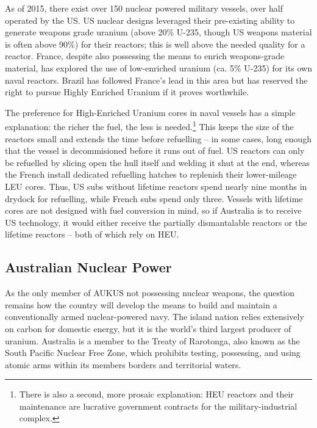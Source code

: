 \documentclass[letterpaper,12pt,twoside]{article} %
\begin{document}
\begin{multicols}{2}
As of 2015, there exist over 150 nuclear powered military vessels, over half operated by the US.\autocite[3]{hippel2016banning} US nuclear designs leveraged their pre-existing ability to generate weapons grade uranium (above 20\% U-235, though US weapons material is often above 90\%) for their reactors; this is well above the needed quality for a reactor. France, despite also possessing the means to enrich weapons-grade material, has explored the use of low-enriched uranium (ca. 5\% U-235) for its own naval reactors. Brazil has followed France's lead in this area but has reserved the right to pursue Highly Enriched Uranium if it proves worthwhile.

The preference for High-Enriched Uranium cores in naval vessels has a simple explanation: the richer the fuel, the less is needed.\footnote{There is also a second, more prosaic explanation: HEU reactors and their maintenance are lucrative government contracts for the military-industrial complex.} This keeps the size of the reactors small and extends the time before refuelling -- in some cases, long enough that the vessel is decommisioned before it runs out of fuel. US reactors can only be refuelled by slicing open the hull itself and welding it shut at the end, whereas the French install dedicated refuelling hatches to replenish their lower-mileage LEU cores. Thus, US subs without lifetime reactors spend nearly nine months in drydock for refuelling, while French subs spend only three.\autocite[24]{hippel2016banning} Vessels with lifetime cores are not designed with fuel conversion in mind, so if Australia is to receive US technology, it would either receive the partially dismantalable reactors or the lifetime reactors -- both of which rely on HEU.

\subsection{Australian Nuclear Power}

As the only member of AUKUS not possessing nuclear weapons, the question remains how the country will develop the means to build and maintain a conventionally armed nuclear-powered navy. The island nation relies extensively on carbon for domestic energy, but it is the world's third largest producer of uranium. Australia is a member to the Treaty of Rarotonga, also known as the South Pacific Nuclear Free Zone, which prohibits testing, possessing, and using atomic arms within its members borders and territorial waters.


\end{multicols}
\end{document}
